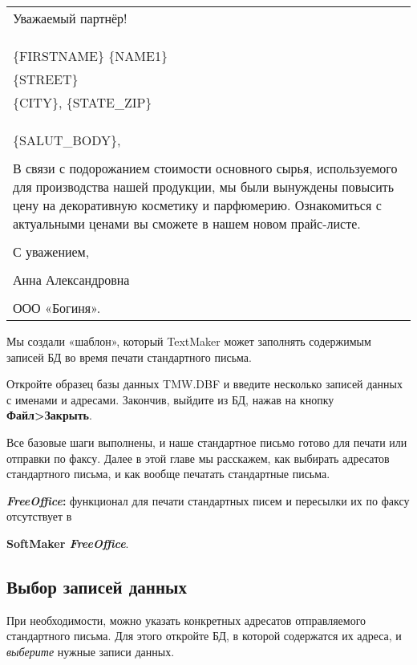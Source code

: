 ﻿\documentclass[a4paper,10pt]{article}
\begin{document}
\begin{center}
\begin{tabular}{ | m{17cm} | }
 \hline
Уважаемый партнёр!\\
\\
\\
\\
\{FIRSTNAME\} \{NAME1\}\\
\{STREET\}\\
\{CITY\}, \{STATE\_ZIP\}\\
\\
\\
\\
\{SALUT\_BODY\},\\
\\
В связи с подорожанием стоимости основного сырья, используемого для производства нашей продукции, мы были вынуждены повысить цену на декоративную косметику и парфюмерию. Ознакомиться с актуальными ценами вы сможете в нашем новом прайс-листе.\\
\\
С уважением,\\
\\
Анна Александровна\\
\\
ООО «Богиня».\\
 \hline
\end{tabular}
\end{center}

Мы создали «шаблон», который TextMaker может заполнять содержимым записей БД во время печати стандартного письма.

Откройте образец базы данных TMW.DBF и введите несколько записей данных с именами и адресами. Закончив, выйдите из БД, нажав на кнопку \textbf{Файл>Закрыть}.

Все базовые шаги выполнены, и наше стандартное письмо готово для печати или отправки по факсу. Далее в этой главе мы расскажем, как выбирать адресатов стандартного письма, и как вообще печатать стандартные письма.

\begin{mdframed}[backgroundcolor=pink!50]
\textbf{\textit{FreeOffice}:} функционал для печати стандартных писем и пересылки их по факсу отсутствует в 

\textbf{SoftMaker \textit{FreeOffice}}.
\end{mdframed}

\subsection{Выбор записей данных}
При необходимости, можно указать конкретных адресатов отправляемого стандартного письма. Для этого откройте БД, в которой содержатся их адреса, и \textit{выберите} нужные записи данных.
\end{document}
